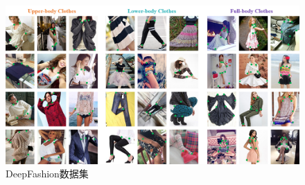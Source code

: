 \begin{figure}[h]
  \centering
  \includegraphics[width=0.9\linewidth]{Img/deepfashion.jpg}
  \caption{DeepFashion数据集}
  \label{fig:deepfashion}
\end{figure}
